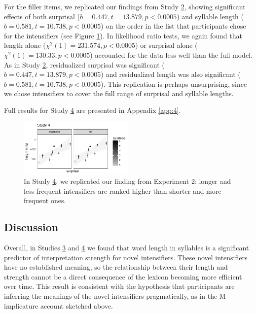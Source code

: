 For the filler items, we replicated our findings from Study \hyperref[sec:study2]{2}, showing significant effects of both surprisal ($b=0.447,t=13.879,p<0.0005$)
and syllable length ($b=0.581,t=10.738,p<0.0005$) on the order in the list that participants chose for the intensifiers (see Figure \ref{fig:plot_study4}).
In likelihood ratio tests, we again found that length alone ($\chi^2(1)=231.574,p<0.0005$) or surprisal alone ($\chi^2(1)=130.33,p<0.0005$) accounted for the data less well than the full model.
As in Study  \hyperref[sec:study2]{2}, residualized surprisal was significant ($b=0.447,t=13.879,p<0.0005
 $) and residualized length was also significant ($b=0.581,t=10.738,p<0.0005$).
This replication is perhaps unsurprising, since we chose intensifiers to cover the full range of surprisal and syllable lengths.

Full results for Study  \hyperref[sec:study4]{4} are presented in Appendix \ref{app:4}.

\begin{figure}[hbt]
\begin{center}
\includegraphics[width=0.5\textwidth]{images/plot_study4.pdf}
\end{center}
\caption{In Study \hyperref[sec:study4]{4}, we replicated our finding from Experiment 2: longer and less frequent intensifiers are ranked higher than shorter and more frequent ones.}
\label{fig:plot_study4}
\end{figure}

\subsection{Discussion}
Overall, in Studies \hyperref[sec:study3]{3} and \hyperref[sec:study4]{4} we found that word length in syllables is a significant predictor of interpretation strength for novel intensifiers.
These novel intensifiers have no established meaning, so the relationship between their length and strength cannot be a direct consequence of the lexicon becoming more efficient over time.
This result is consistent with the hypothesis that participants are inferring the meanings of the novel intensifiers pragmatically, as in the M-implicature account sketched above.

